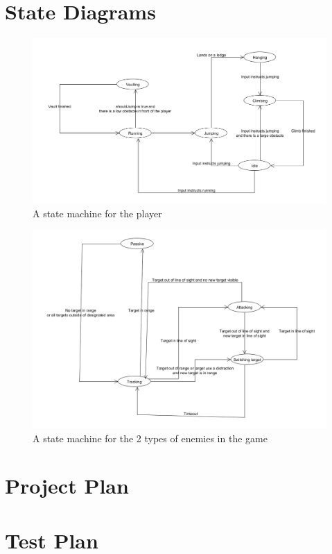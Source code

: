 \documentclass[a4paper,10pt]{article}
\begin{document}
\section{State Diagrams}
\begin{figure}[H]
	\begin{center}
		\includegraphics[scale=0.4]{images/PlayerStateMachine.png}
		\caption{A state machine for the player}
	\end{center}
\end{figure}
\begin{figure}[H]
	\begin{center}
		\includegraphics[scale=0.4]{images/EnemyStateMachine.png}
		\caption{A state machine for the 2 types of enemies in the game}
	\end{center}
\end{figure}

\section{Project Plan}

\section{Test Plan}
\end{document}
